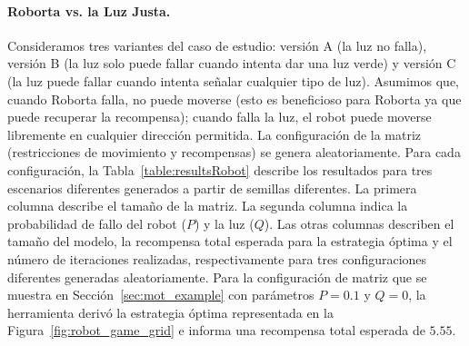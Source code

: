 \paragraph{Roborta vs. la Luz Justa.}
Consideramos tres variantes del caso de estudio: versión A (la luz no falla), versión B (la luz solo puede fallar cuando intenta dar una luz verde) y versión C (la luz puede fallar cuando intenta señalar cualquier tipo de luz).
Asumimos que, cuando Roborta falla, no puede moverse (esto es beneficioso para Roborta ya que puede recuperar la recompensa);
cuando falla la luz, el robot puede moverse libremente en cualquier dirección permitida.
La configuración de la matriz (restricciones de movimiento y recompensas) se genera aleatoriamente. Para cada configuración, la Tabla~\ref{table:resultsRobot} describe los resultados para tres escenarios diferentes generados a partir de semillas diferentes. La primera columna describe el tamaño de la matriz. La segunda columna indica la probabilidad de fallo del robot ($P$) y la luz ($Q$).
Las otras columnas describen el tamaño del modelo, la recompensa total esperada para la estrategia óptima y el número de iteraciones realizadas, respectivamente para tres configuraciones diferentes generadas aleatoriamente.
Para la configuración de matriz que se muestra en Sección~\ref{sec:mot_example} con parámetros $P=0.1$ y $Q=0$, la herramienta derivó la estrategia óptima representada en la Figura~\ref{fig:robot_game_grid} e informa una recompensa total esperada de $5.55$.



